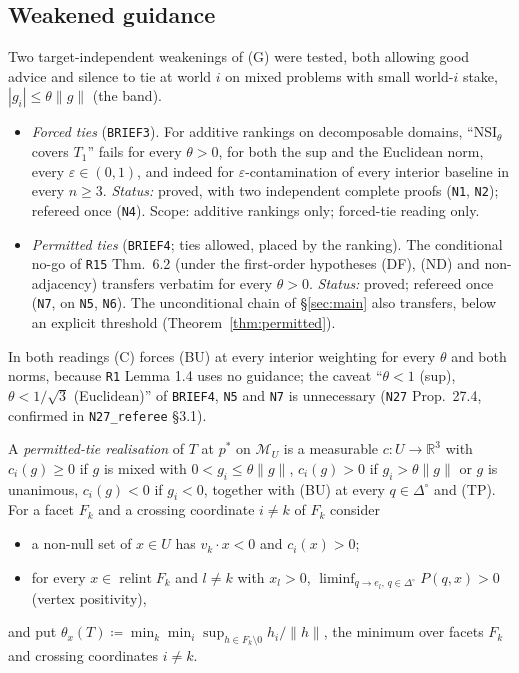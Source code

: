\documentclass[11pt]{article}
\theoremstyle{definition}
\theoremstyle{remark}
\newcommand{\R}{\mathbb R}
\newcommand{\Di}{\Delta^{\circ}}
\newcommand{\M}{\mathcal M}
\newcommand{\relint}{\operatorname{relint}}
\newcommand{\src}[1]{\texttt{#1}}
\begin{document}
\subsection{Weakened guidance}\label{sec:open-ties}
Two target-independent weakenings of (G) were tested, both allowing good advice and silence to tie at world $i$ on mixed problems with small world-$i$ stake, $|g_i|\le\theta\|g\|$ (the band).
\begin{itemize}[leftmargin=*]
\item \emph{Forced ties} (\src{BRIEF3}). For additive rankings on decomposable domains, ``NSI$_\theta$ covers $T_1$'' fails for every $\theta>0$, for both the sup and the Euclidean norm, every $\varepsilon\in(0,1)$, and indeed for $\varepsilon$-contamination of every interior baseline in every $n\ge3$. \emph{Status:} proved, with two independent complete proofs (\src{N1}, \src{N2}); refereed once (\src{N4}). Scope: additive rankings only; forced-tie reading only.
\item \emph{Permitted ties} (\src{BRIEF4}; ties allowed, placed by the ranking). The conditional no-go of \src{R15} Thm.~6.2 (under the first-order hypotheses (DF), (ND) and non-adjacency) transfers verbatim for every $\theta>0$. \emph{Status:} proved; refereed once (\src{N7}, on \src{N5}, \src{N6}). The unconditional chain of \S\ref{sec:main} also transfers, below an explicit threshold (Theorem~\ref{thm:permitted}).
\end{itemize}
In both readings (C) forces (BU) at every interior weighting for every $\theta$ and both norms, because \src{R1} Lemma 1.4 uses no guidance; the caveat ``$\theta<1$ (sup), $\theta<1/\sqrt3$ (Euclidean)'' of \src{BRIEF4}, \src{N5} and \src{N7} is unnecessary (\src{N27} Prop.~27.4, confirmed in \src{N27\_referee} \S3.1).

A \emph{permitted-tie realisation} of $T$ at $p^*$ on $\M_U$ is a measurable $c:U\to\R^3$ with $c_i(g)\ge0$ if $g$ is mixed with $0<g_i\le\theta\|g\|$, $c_i(g)>0$ if $g_i>\theta\|g\|$ or $g$ is unanimous, $c_i(g)<0$ if $g_i<0$, together with (BU) at every $q\in\Di$ and (TP). For a facet $F_k$ and a crossing coordinate $i\ne k$ of $F_k$ consider
\begin{itemize}[leftmargin=*]
\item[\textbf{(X$_{ik}$)}] a non-null set of $x\in U$ has $v_k\cdot x<0$ and $c_i(x)>0$;
\item[\textbf{(VP)}] for every $x\in\relint F_k$ and $l\ne k$ with $x_l>0$, $\liminf_{q\to e_l,\,q\in\Di}P(q,x)>0$ (vertex positivity),
\end{itemize}
and put $\theta_x(T)\coloneqq\min_k\min_{i}\sup_{h\in F_k\setminus0}h_i/\|h\|$, the minimum over facets $F_k$ and crossing coordinates $i\ne k$.
\end{document}
